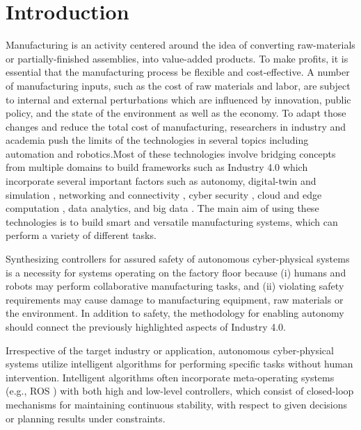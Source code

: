 \documentclass[3p,twocolumn,times,procedia]{elsarticle}
\begin{document}
\vspace*{-10pt}
\section{Introduction}
\label{main}
Manufacturing is an activity centered around the idea of converting raw-materials or partially-finished assemblies, into value-added products. To make profits, it is essential that the manufacturing process be flexible and cost-effective. A number of manufacturing inputs, such as the cost of raw materials and labor, are subject to internal and external perturbations which are influenced by innovation, public policy, and the state of the environment as well as the economy. To adapt those \newpage\vspace*{10pt}changes and reduce the total cost of manufacturing, researchers in industry and academia push the limits of the technologies in several topics including automation and robotics.Most of these technologies involve bridging concepts from multiple domains to build frameworks such as Industry 4.0 which incorporate several important factors such as autonomy, digital-twin and simulation \cite{digit_twin}, networking and connectivity \cite{smart_man}, cyber security \cite{cyber_sec}, cloud and edge computation \cite{hotcloud}, data analytics, and big data \cite{cloud_manuf}. The main aim of using these technologies is to build smart and versatile manufacturing systems, which can perform a variety of different tasks.

Synthesizing controllers for assured safety of autonomous cyber-physical systems is a necessity for systems operating on the factory floor because (i) humans and robots may perform collaborative manufacturing tasks, and (ii) violating safety requirements may cause damage to manufacturing equipment, raw materials or the environment. In addition to safety, the methodology for enabling autonomy should connect the previously highlighted aspects of Industry 4.0. 

Irrespective of the target industry or application, autonomous cyber-physical systems utilize intelligent algorithms for performing specific tasks without human intervention. Intelligent algorithms often incorporate meta-operating systems (e.g., ROS \cite{ros_item}) with both high and low-level controllers, which consist of closed-loop mechanisms for maintaining continuous stability, with respect to given decisions or planning results under constraints.
\end{document}
